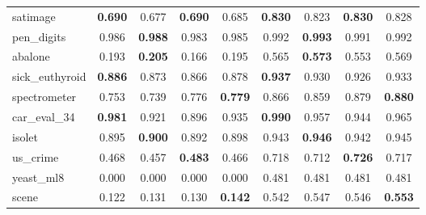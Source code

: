 \begin{figure}[ht]
\begin{tabular}{p{22mm}|*4{p{14mm}}|*4{p{14mm}}}
        satimage&\multicolumn{1}{c}{\textbf{0.690}}&\multicolumn{1}{c}{0.677}&\multicolumn{1}{c}{\textbf{0.690}}&\multicolumn{1}{c|}{0.685}&\multicolumn{1}{c}{\textbf{0.830}}&\multicolumn{1}{c}{0.823}&\multicolumn{1}{c}{\textbf{0.830}}&\multicolumn{1}{c}{0.828}\\
        pen\_digits&\multicolumn{1}{c}{0.986}&\multicolumn{1}{c}{\textbf{0.988}}&\multicolumn{1}{c}{0.983}&\multicolumn{1}{c|}{0.985}&\multicolumn{1}{c}{0.992}&\multicolumn{1}{c}{\textbf{0.993}}&\multicolumn{1}{c}{0.991}&\multicolumn{1}{c}{0.992}\\
        abalone&\multicolumn{1}{c}{0.193}&\multicolumn{1}{c}{\textbf{0.205}}&\multicolumn{1}{c}{0.166}&\multicolumn{1}{c|}{0.195}&\multicolumn{1}{c}{0.565}&\multicolumn{1}{c}{\textbf{0.573}}&\multicolumn{1}{c}{0.553}&\multicolumn{1}{c}{0.569}\\
        sick\_euthyroid&\multicolumn{1}{c}{\textbf{0.886}}&\multicolumn{1}{c}{0.873}&\multicolumn{1}{c}{0.866}&\multicolumn{1}{c|}{0.878}&\multicolumn{1}{c}{\textbf{0.937}}&\multicolumn{1}{c}{0.930}&\multicolumn{1}{c}{0.926}&\multicolumn{1}{c}{0.933}\\
        spectrometer&\multicolumn{1}{c}{0.753}&\multicolumn{1}{c}{0.739}&\multicolumn{1}{c}{0.776}&\multicolumn{1}{c|}{\textbf{0.779}}&\multicolumn{1}{c}{0.866}&\multicolumn{1}{c}{0.859}&\multicolumn{1}{c}{0.879}&\multicolumn{1}{c}{\textbf{0.880}}\\
        car\_eval\_34&\multicolumn{1}{c}{\textbf{0.981}}&\multicolumn{1}{c}{0.921}&\multicolumn{1}{c}{0.896}&\multicolumn{1}{c|}{0.935}&\multicolumn{1}{c}{\textbf{0.990}}&\multicolumn{1}{c}{0.957}&\multicolumn{1}{c}{0.944}&\multicolumn{1}{c}{0.965}\\
        isolet&\multicolumn{1}{c}{0.895}&\multicolumn{1}{c}{\textbf{0.900}}&\multicolumn{1}{c}{0.892}&\multicolumn{1}{c|}{0.898}&\multicolumn{1}{c}{0.943}&\multicolumn{1}{c}{\textbf{0.946}}&\multicolumn{1}{c}{0.942}&\multicolumn{1}{c}{0.945}\\
        us\_crime&\multicolumn{1}{c}{0.468}&\multicolumn{1}{c}{0.457}&\multicolumn{1}{c}{\textbf{0.483}}&\multicolumn{1}{c|}{0.466}&\multicolumn{1}{c}{0.718}&\multicolumn{1}{c}{0.712}&\multicolumn{1}{c}{\textbf{0.726}}&\multicolumn{1}{c}{0.717}\\
        yeast\_ml8&\multicolumn{1}{c}{0.000}&\multicolumn{1}{c}{0.000}&\multicolumn{1}{c}{0.000}&\multicolumn{1}{c|}{0.000}&\multicolumn{1}{c}{0.481}&\multicolumn{1}{c}{0.481}&\multicolumn{1}{c}{0.481}&\multicolumn{1}{c}{0.481}\\
        scene&\multicolumn{1}{c}{0.122}&\multicolumn{1}{c}{0.131}&\multicolumn{1}{c}{0.130}&\multicolumn{1}{c|}{\textbf{0.142}}&\multicolumn{1}{c}{0.542}&\multicolumn{1}{c}{0.547}&\multicolumn{1}{c}{0.546}&\multicolumn{1}{c}{\textbf{0.553}}\\

\end{tabular}
\end{figure}
